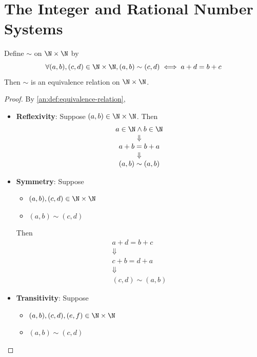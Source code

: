 \section{The Integer and Rational Number Systems}

\begin{theorem} \label{an:thm:integer-construction-relation-is-equivalence}
  Define $\sim$ on $\N \times \N$ by
  \[
    \forall (a, b), (c, d) \in \N \times \N, (a, b) \sim (c, d) \iff a + d = b + c
  \]
  Then $\sim$ is an equivalence relation on $\N \times \N$.
\end{theorem}

\begin{proof}
  By \cref{an:def:equivalence-relation},
  \begin{itemize}
    \item \textbf{Reflexivity}: Suppose $(a, b) \in \N \times \N$. Then
          \[
            \begin{array}{c}
              a \in \N \land b \in \N \\
              \Downarrow              \\
              a + b = b + a           \\
              \Downarrow              \\
              (a, b) \sim (a, b)
            \end{array}
          \]
    \item \textbf{Symmetry}: Suppose
          \begin{itemize}
            \item $(a, b), (c, d) \in \N \times \N$
            \item $(a, b) \sim (c, d)$
          \end{itemize}
          Then
          \[
            \begin{array}{c}
              a + d = b + c \\
              \Downarrow    \\
              c + b = d + a \\
              \Downarrow    \\
              (c, d) \sim (a, b)
            \end{array}
          \]
    \item \textbf{Transitivity}: Suppose
          \begin{itemize}
            \item $(a, b), (c, d), (e, f) \in \N \times \N$
            \item $(a, b) \sim (c, d)$

\end{itemize}
\end{itemize}
\end{proof}
